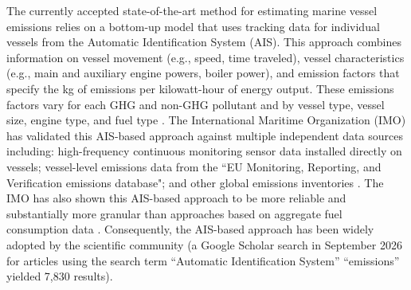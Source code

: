 \documentclass[lineno,pdflatex,sn-nature]{sn-jnl}
\begin{document}
The currently accepted state-of-the-art method for estimating marine vessel emissions relies on a bottom-up model that uses tracking data for individual vessels from the Automatic Identification System (AIS). This approach combines information on vessel movement (e.g., speed, time traveled), vessel characteristics (e.g., main and auxiliary engine powers, boiler power), and emission factors that specify the kg of emissions per kilowatt-hour of energy output. These emissions factors vary for each GHG and non-GHG pollutant and by vessel type, vessel size, engine type, and fuel type \cite{olmer2017greenhouse, fourth2020greenhouse}. The International Maritime Organization (IMO) has validated this AIS-based approach against multiple independent data sources including: high-frequency continuous monitoring sensor data installed directly on vessels; vessel-level emissions data from the ``EU Monitoring, Reporting, and Verification emissions database"; and other global emissions inventories \cite{fourth2020greenhouse}. The IMO has also shown this AIS-based approach to be more reliable and substantially more granular than approaches based on aggregate fuel consumption data \cite{fourth2020greenhouse}. Consequently, the AIS-based approach has been widely adopted by the scientific community (a Google Scholar search in September 2026 for articles using the search term ``Automatic Identification System'' ``emissions'' yielded 7,830 results). 
\end{document}
